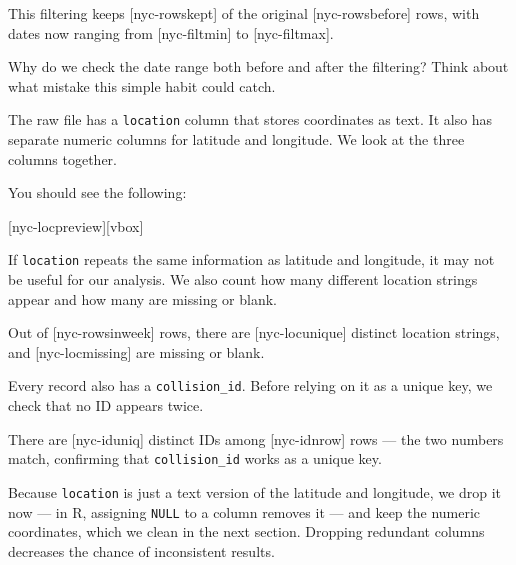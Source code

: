
This filtering keeps [nyc-rowskept] of the
original [nyc-rowsbefore] rows, with
dates now ranging from
[nyc-filtmin] to
[nyc-filtmax].

Why do we check the date range both before and after the filtering? Think
about what mistake this simple habit could catch.

The raw file has a \lstinline{location} column that stores coordinates as
text. It also has separate numeric columns for latitude and longitude.
We look at the three columns together.


You should see the following:

[nyc-locpreview][vbox]

If \lstinline{location} repeats the same information as latitude and
longitude, it may not be useful for our analysis. We also count how many
different location strings appear and how many are missing or blank.


Out of [nyc-rowsinweek] rows, there are
[nyc-locunique] distinct location
strings, and [nyc-locmissing] are
missing or blank.

Every record also has a \lstinline{collision_id}. Before relying on it
as a unique key, we check that no ID appears twice.


There are [nyc-iduniq]
distinct IDs among [nyc-idnrow] rows --- the
two numbers match, confirming that \lstinline{collision_id} works as a
unique key.

Because \lstinline{location} is just a text version of the latitude and
longitude, we drop it now --- in R, assigning \lstinline{NULL} to a
column removes it --- and keep the numeric coordinates, which we clean
in the next section. Dropping redundant columns decreases the chance
of inconsistent results.

